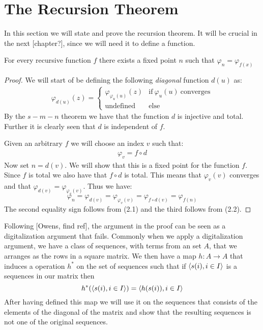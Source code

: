 \documentclass[../main.tex]{subfiles}
\begin{document}
\section{The Recursion Theorem}
In this section we will state and prove the recursion theorem. It will be
crucial in the next [chapter?], since we will need it to define a function.
\begin{thm}
	For every recursive function $f$ there exists a fixed point $n$ such
	that $\varphi_n=\varphi_{f(x)}$
\end{thm}
\begin{proof}
	We will start of be defining the following \textit{diagonal} function
	$d(u)$ as:
	\begin{align}\varphi_{d(u)}(z)=\begin{cases}
		\varphi_{\varphi_u(u)}(z)& \text{if}\ \varphi_u(u)\
		\text{converges}\\
		\text{undefined} & \text{else}
	\end{cases}
	\end{align}
	By the $s-m-n$ theorem we have that the function $d$ is injective and
	total. Further it is clearly seen that $d$ is independent of $f$.

	Given an arbitrary $f$ we will choose an index $v$ such that:
	\begin{align}
		\varphi_v=f\circ d
	\end{align}
	Now set $n=d(v)$. We will show that this is a fixed point for the
	function $f$. Since $f$ is total we also have that $f\circ d$ is total.
	This means that $\varphi_v(v)$ converges and that
	$\varphi_{d(v)}=\varphi_{\varphi_v(v)}$. Thus we have:
	$$\varphi_n=\varphi_{d(v)}=\varphi_{\varphi_v(v)}=\varphi_{f\circ
	d(v)}=\varphi_{f(n)}$$
	The second equality sign follows from (2.1) and the third follows from (2.2).
\end{proof}
Following [Owens, find ref], the argument in the proof can be seen as a
digitalization argument that fails. Commonly when we apply a digitalization
argument, we have a class of sequences, with terms from an set $A$, that we arranges as the rows in a square
matrix. We then have a map $h:A\rightarrow A$ that induces a operation $h^*$ on
the set of sequences such that if $\langle s(i),i\in I\rangle$ is a sequences in our
matrix then 
$$h^*(\langle s(i),i\in I\rangle)=\langle h(s(i)),i\in I\rangle$$
After having defined this map we will use it on the sequences that consists of
the elements of the  diagonal of the matrix and
show that the resulting sequences is not one of the original sequences. 
\end{document}
